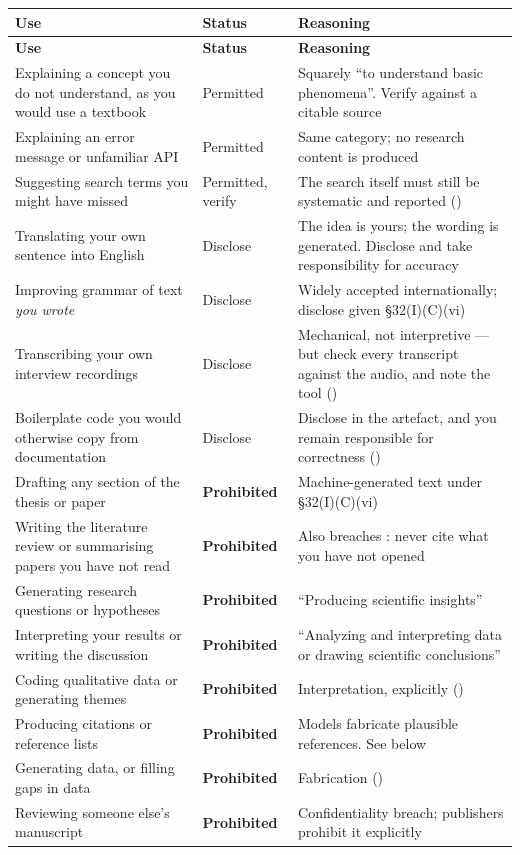 \begin{center}
\small
\begin{longtable}{@{}L{5.4cm}L{2.4cm}L{6.0cm}@{}}
\toprule
\textbf{Use} & \textbf{Status} & \textbf{Reasoning} \\
\midrule
\endfirsthead
\toprule
\textbf{Use} & \textbf{Status} & \textbf{Reasoning} \\
\midrule
\endhead
\bottomrule
\endfoot
Explaining a concept you do not understand, as you would use a textbook
  & Permitted
  & Squarely ``to understand basic phenomena''. Verify against a citable
    source \\
Explaining an error message or unfamiliar API
  & Permitted
  & Same category; no research content is produced \\
Suggesting search terms you might have missed
  & Permitted, verify
  & The search itself must still be systematic and reported
    () \\
Translating your own sentence into English
  & Disclose
  & The idea is yours; the wording is generated. Disclose and take
    responsibility for accuracy \\
Improving grammar of text \emph{you wrote}
  & Disclose
  & Widely accepted internationally; disclose given \S32(I)(C)(vi) \\
Transcribing your own interview recordings
  & Disclose
  & Mechanical, not interpretive --- but check every transcript against the
    audio, and note the tool () \\
Boilerplate code you would otherwise copy from documentation
  & Disclose
  & Disclose in the artefact, and you remain responsible for correctness
    () \\
\midrule
Drafting any section of the thesis or paper
  & \textbf{Prohibited}
  & Machine-generated text under \S32(I)(C)(vi) \\
Writing the literature review or summarising papers you have not read
  & \textbf{Prohibited}
  & Also breaches : never cite what you have not opened \\
Generating research questions or hypotheses
  & \textbf{Prohibited}
  & ``Producing scientific insights'' \\
Interpreting your results or writing the discussion
  & \textbf{Prohibited}
  & ``Analyzing and interpreting data or drawing scientific conclusions'' \\
Coding qualitative data or generating themes
  & \textbf{Prohibited}
  & Interpretation, explicitly () \\
Producing citations or reference lists
  & \textbf{Prohibited}
  & Models fabricate plausible references. See below \\
Generating data, or filling gaps in data
  & \textbf{Prohibited}
  & Fabrication () \\
Reviewing someone else's manuscript
  & \textbf{Prohibited}
  & Confidentiality breach; publishers prohibit it explicitly \\
\end{longtable}
\end{center}

